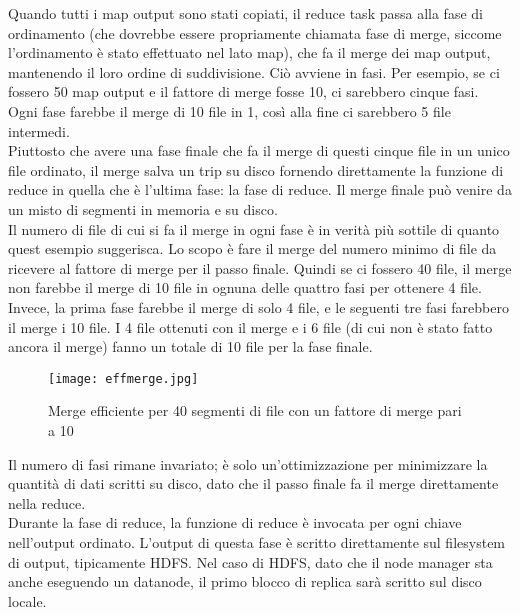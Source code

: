 Quando tutti i map output sono stati copiati, il reduce task passa alla fase di ordinamento (che dovrebbe essere propriamente chiamata fase di merge, siccome l'ordinamento è stato effettuato nel lato map), che fa il merge dei map output, mantenendo il loro ordine di suddivisione. Ciò avviene in fasi. Per esempio, se ci fossero 50 map output e il fattore di merge fosse 10, ci sarebbero cinque fasi. Ogni fase farebbe il merge di 10 file in 1, così alla fine ci sarebbero 5 file intermedi. \\
Piuttosto che avere una fase finale che fa il merge di questi cinque file in un unico file ordinato, il merge salva un trip su disco fornendo direttamente la funzione di reduce in quella che è l'ultima fase: la fase di reduce. Il merge finale può venire da un misto di segmenti in memoria e su disco. \\
Il numero di file di cui si fa il merge in ogni fase è in verità più sottile di quanto quest esempio suggerisca. Lo scopo è fare il merge del numero minimo di file da ricevere al fattore di merge per il passo finale. Quindi se ci fossero 40 file, il merge non farebbe il merge di 10 file in ognuna delle quattro fasi per ottenere 4 file. Invece, la prima fase farebbe il merge di solo 4 file, e le seguenti tre fasi farebbero il merge i 10 file. I 4 file ottenuti con il merge e i 6 file (di cui non è stato fatto ancora il merge) fanno un totale di 10 file per la fase finale. \\
\begin{figure}
  \begin{center}
    \texttt{[image: effmerge.jpg]}
    \caption{Merge efficiente per 40 segmenti di file con un fattore di merge pari a 10}
    \label{fig:architecture}
  \end{center}
\end{figure}
Il numero di fasi rimane invariato; è solo un'ottimizzazione per minimizzare la quantità di dati scritti su disco, dato che il passo finale fa il merge direttamente nella reduce. \\
Durante la fase di reduce, la funzione di reduce è invocata per ogni chiave nell'output ordinato. L'output di questa fase è scritto direttamente sul filesystem di output, tipicamente HDFS. Nel caso di HDFS, dato che il node manager sta anche eseguendo un datanode, il primo blocco di replica sarà scritto sul disco locale.


